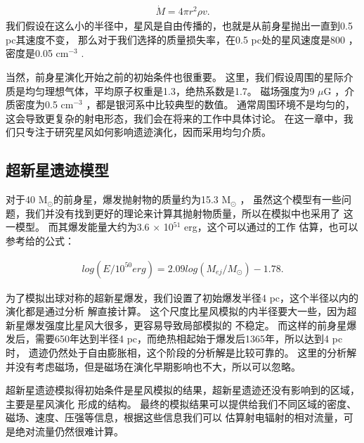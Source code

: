 \begin{equation}
  \begin{aligned}
    \dot{M}=4\pi r^2\rho v.
  \end{aligned}
\end{equation}
我们假设在这么小的半径中，星风是自由传播的，也就是从前身星抛出一直到0.5 pc其速度不变，
那么对于我们选择的质量损失率，在0.5 pc处的星风速度是800 \kms，密度是0.05 cm$^{-3}$
\citep{Meyer2014}.

当然，前身星演化开始之前的初始条件也很重要。
这里，我们假设周围的星际介质是均匀理想气体，平均原子权重是1.3，绝热系数是1.7。
磁场强度为9 $\mu$G \citep{Haverkorn2015}，介质密度为0.5 cm$^{-3}$
\citep{Nakanishi2006,Nakanishi2016}，都是银河系中比较典型的数值。
通常周围环境不是均匀的，这会导致更复杂的射电形态，我们会在将来的工作中具体讨论。
在这一章中，我们只专注于研究星风如何影响遗迹演化，因而采用均匀介质。

\subsection{超新星遗迹模型}
对于40 M$_{\odot}$的前身星，爆发抛射物的质量约为15.3 M$_{\odot}$ \citep{Sukhbold2016}，
虽然这个模型有一些问题，我们并没有找到更好的理论来计算其抛射物质量，所以在模拟中也采用了
这一模型。
而其爆发能量大约为3.6 $\times$ 10$^{51}$ erg，这个可以通过\citet{Poznanski2013}的工作
估算，也可以参考\citet{Mueller2016a}给的公式：

\begin{equation}
  \begin{aligned}
    log(E/10^{50}erg)=2.09log(M_{ej}/M_{\odot})-1.78.
  \end{aligned}
\end{equation}

为了模拟出球对称的超新星爆发，我们设置了初始爆发半径4 pc，这个半径以内的演化都是通过分析
解直接计算。
这个尺度比星风模拟的内半径要大一些，因为超新星爆发强度比星风大很多，更容易导致局部模拟的
不稳定。
而这样的前身星爆发后，需要650年达到半径4 pc，而绝热相起始于爆发后1365年，所以达到4 pc时，
遗迹仍然处于自由膨胀相，这个阶段的分析解是比较可靠的\citep{Leahy2017a,Truelove1999}。
这里的分析解并没有考虑磁场，但是磁场在演化早期影响也不大，所以可以忽略。

超新星遗迹模拟得初始条件是星风模拟的结果，超新星遗迹还没有影响到的区域，主要是星风演化
形成的结构。
最终的模拟结果可以提供给我们不同区域的密度、磁场、速度、压强等信息，根据这些信息我们可以
估算射电辐射的相对流量，可是绝对流量仍然很难计算。

